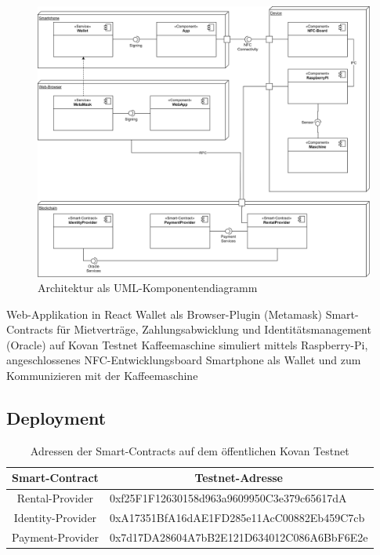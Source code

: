 \begin{figure}[h]
 \centering
 \includegraphics[width=1.0\textwidth]{gfx/Architecture.png}
 \caption{Architektur als UML-Komponentendiagramm}
 \label{fig:chapter07:architecture}
\end{figure}

Web-Applikation in React
Wallet als Browser-Plugin (Metamask)
Smart-Contracts für Mietverträge, Zahlungsabwicklung und Identitätsmanagement (Oracle) auf Kovan Testnet
Kaffeemaschine simuliert mittels Raspberry-Pi, angeschlossenes NFC-Entwicklungsboard
Smartphone als Wallet und zum Kommunizieren mit der Kaffeemaschine

\subsection{Deployment}
\label{subsec:implementation:poc:deployment}

\begin{table}[]
\begin{tabular}{@{}cl@{}}
\toprule
\textbf{Smart-Contract} & \multicolumn{1}{c}{\textbf{Testnet-Adresse}} \\ \midrule
Rental-Provider & 0xf25F1F12630158d963a9609950C3e379c65617dA \\
Identity-Provider & 0xA17351BfA16dAE1FD285e11AcC00882Eb459C7cb \\
Payment-Provider & 0x7d17DA28604A7bB2E121D634012C086A6BbF6E2e \\ \bottomrule
\end{tabular}
\caption{Adressen der Smart-Contracts auf dem öffentlichen Kovan Testnet}
\label{tab:addresses}
\end{table}


